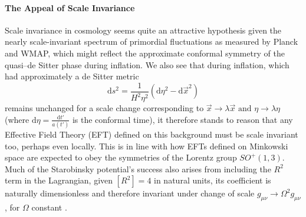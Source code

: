 \documentclass[aps,prd,reprint,preprintnumbers,showpacs,floatfix,nofootinbib,superscript address]{revtex4-2}
\newcommand{\wb}[1]{{\color[RGB]{255,0,0}{\textbf{\textit{[WB: #1]}}}}}
\newcommand{\pcs}[1]{{\color[RGB]{0,100,0}{\textbf{\textit{[PCS: #1]}}}}}
\begin{document}
\paragraph*{The Appeal of Scale Invariance} Scale invariance in cosmology seems quite an attractive hypothesis given the nearly scale-invariant spectrum of primordial fluctuations as measured by Planck \cite{collaboration_planck_2020, collaboration_bicep_2021} and WMAP, which might reflect the approximate conformal symmetry of the quasi–de Sitter phase during inflation. We also see that during inflation, which had approximately a de Sitter metric
\begin{equation} \label{deSitter Conformal}
    \text{d}s^2 = \frac{1}{H^2\eta^2}(\text{d}\eta^2 - \text{d}\Vec{x}^2)
\end{equation} 
remains unchanged for a scale change corresponding to $\Vec{x} \rightarrow \lambda \Vec{x} \,\, \text{and} \,\, \eta \rightarrow \lambda \eta$ (where $\text{d}\eta =  \frac{\text{d}t'}{a(t')}$ is the conformal time), it therefore stands to reason that any Effective Field Theory (EFT) defined on this background must be scale invariant too, perhaps even locally. This is in line with how EFTs defined on Minkowski space are expected to obey the symmetries of the Lorentz group $SO^+(1,3)$. Much of the Starobinsky potential's success also arises from including the $R^2$ term in the Lagrangian, given $[R^2] = 4$ in natural units, its coefficient is naturally dimensionless and therefore invariant under change of scale $g_{\mu\nu} \rightarrow \Omega^2 g_{\mu\nu}$, for $\Omega$ constant \cite{whitt_fourth-order_1984, Cecchini_2024}.

\end{document}
